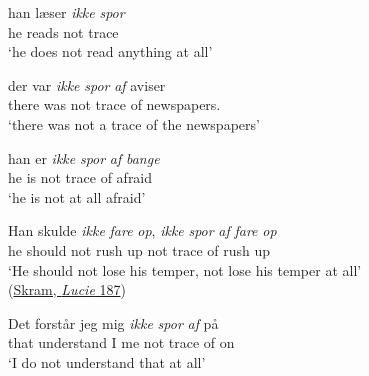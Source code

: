 \z

\ea \label{ex:02-19}
\gll han læser \textit{ikke} \textit{spor}\\
 he reads not trace\\
\glt `he does not read anything at all'


\z

\ea \label{ex:02-20}
\gll der var \textit{ikke} \textit{spor} \textit{af} aviser\\
 there was not trace of newspapers.\DEF{}\\
\glt `there was not a trace of the newspapers'

\z

\ea \label{ex:02-21}
\ea
\gll han er \textit{ikke} \textit{spor} \textit{af} \textit{bange}\\
 he is not trace of afraid\\
\glt `he is not at all afraid'

\ex 
\gll Han skulde \textit{ikke} \textit{fare} \textit{op}, \textit{ikke} \textit{spor} \textit{af} \textit{fare} \textit{op}\\
 he should not rush up not trace of rush up\\
\glt `He should not lose his temper, not lose his temper at all'\\ \hfill(\href{https://www.bokselskap.no/boker/lucie/xviii}{Skram, \textit{Lucie} 187})
\z
\z

\ea \label{ex:02-23}
 \gll Det forstår jeg mig \textit{ikke} \textit{spor} \textit{af} på\\
 that understand I me not trace of on\\
 \glt`I do not understand that at all'
\z{}

